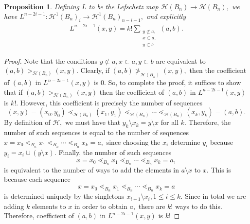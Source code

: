 \documentclass[10 pt]{amsart}
\theoremstyle{plain}
\newtheorem{prop}[thm]{Proposition}
\theoremstyle{definition}
\theoremstyle{remark}
\numberwithin{equation}{section}
\newcommand\fbn{\mathcal H}
\begin{document}
\begin{prop}
\label{prop:explicit_gbn_lefchetz}
Defining $L$ to be the Lefschetz map $\mathcal H(B_n) \rightarrow \mathcal H(B_n),$ we have $L^{n-2i-1}:\fbn^1(B_n)_i \rightarrow \fbn^1(B_n)_{n-i-1},$ and explicitly 
\begin{align*}
  L^{n-2i-1}(x, y)= k!\sum_{\substack{{y \not \subset a,}\\{x\subset a,}\\{y \subset b}}}^{}(a, b).
\end{align*}
\end{prop}
\begin{proof}
Note that the conditions $y \not \subset a, x\subset a, y\subset b$ are equivalent to $(a, b) >_{ \mathcal H(B_n)} (x, y).$ Clearly, if $(a, b) \not >_{ \mathcal H(B_n)} (x, y),$ then the coefficient of $(a, b)$ in $  L^{n-2i-1}(x, y)$ is 0. So, to complete the proof, it suffices to show that if  $(a, b) >_{ \mathcal H(B_n)} (x, y)$ then the coefficient of $(a, b)$ in $  L^{n-2i-1}(x, y)$ is $k!$. However, this coefficient is precisely the number of sequences 
$$(x, y) = (x_0, y_0) \lessdot_{ \mathcal H(B_n)} (x_1, y_1) \lessdot_{ \mathcal H(B_n)}  \cdots \lessdot_{ \mathcal H(B_n)}  (x_k, y_k) = (a, b).$$
By definition of $ \mathcal H,$ we must have that $y_k \setminus x_k = y\setminus x$ for all $k.$ Therefore, the number of such sequences is equal to the number of sequences $x=x_0 \lessdot_{B_n} x_1 \lessdot_{B_n} \cdots \lessdot_{B_n} x_k = a,$ since choosing the $x_i$ determine $y_i$ because $y_i = x_i \cup (y \setminus x).$ Finally, the number of such sequences  
$$x=x_0 \lessdot_{B_n} x_1 \lessdot_{B_n} \cdots \lessdot_{B_n} x_k = a,$$
is equivalent to the number of ways to add the elements in $a \setminus x$ to $x$. This is because each sequence 
$$x=x_0 \lessdot_{B_n} x_1 \lessdot_{B_n} \cdots \lessdot_{B_n} x_k = a$$
is determined uniquely by the singletons $x_{i+1} \setminus x_i, 1 \leq i \leq k.$ Since in total we are adding $k$ elements to $x$ in order to obtain $a,$ there are $k!$ ways to do this. Therefore, coefficient of $(a, b)$ in $ L^{n-2i-1}(x, y)$ is $k!$
\end{proof}
\end{document}
